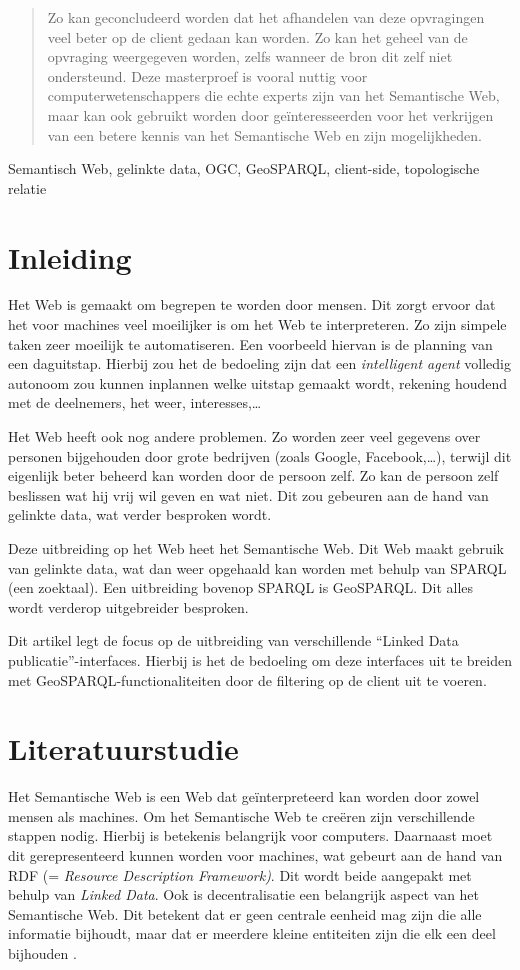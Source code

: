 \documentclass[twocolumn]{phdsymp} %
\begin{document}
\begin{abstract}
    Zo kan geconcludeerd worden dat het afhandelen van deze opvragingen veel beter op de client gedaan kan worden. Zo kan het geheel van de opvraging weergegeven worden, zelfs wanneer de bron dit zelf niet ondersteund. Deze masterproef is vooral nuttig voor computerwetenschappers die echte experts zijn van het Semantische Web, maar kan ook gebruikt worden door geïnteresseerden voor het verkrijgen van een betere kennis van het Semantische Web en zijn mogelijkheden.
\end{abstract}

\begin{keywords}
    Semantisch Web, gelinkte data, OGC, GeoSPARQL, client-side, topologische relatie
\end{keywords}

\section{Inleiding}
Het Web is gemaakt om begrepen te worden door mensen. Dit zorgt ervoor dat het voor machines veel moeilijker is om het Web te interpreteren. Zo zijn simpele taken zeer moeilijk te automatiseren. Een voorbeeld hiervan is de planning van een daguitstap. Hierbij zou het de bedoeling zijn dat een \textit{intelligent agent} volledig autonoom zou kunnen inplannen welke uitstap gemaakt wordt, rekening houdend met de deelnemers, het weer, interesses,\dots 

Het Web heeft ook nog andere problemen. Zo worden zeer veel gegevens over personen bijgehouden door grote bedrijven (zoals Google, Facebook,\dots), terwijl dit eigenlijk beter beheerd kan worden door de persoon zelf. Zo kan de persoon zelf beslissen wat hij vrij wil geven en wat niet. Dit zou gebeuren aan de hand van gelinkte data, wat verder besproken wordt.

Deze uitbreiding op het Web heet het Semantische Web. Dit Web maakt gebruik van gelinkte data, wat dan weer opgehaald kan worden met behulp van SPARQL (een zoektaal). Een uitbreiding bovenop SPARQL is GeoSPARQL. Dit alles wordt verderop uitgebreider besproken.

Dit artikel legt de focus op de uitbreiding van verschillende ``Linked Data publicatie''-interfaces. Hierbij is het de bedoeling om deze interfaces uit te breiden met GeoSPARQL-functionaliteiten door de filtering op de client uit te voeren.

\section{Literatuurstudie}
Het Semantische Web is een Web dat geïnterpreteerd kan worden door zowel mensen als machines. Om het Semantische Web te creëren zijn verschillende stappen nodig. Hierbij is betekenis belangrijk voor computers. Daarnaast moet dit gerepresenteerd kunnen worden voor machines, wat gebeurt aan de hand van RDF (= \textit{Resource Description Framework)}. Dit wordt beide aangepakt met behulp van \textit{Linked Data}. Ook is decentralisatie een belangrijk aspect van het Semantische Web. Dit betekent dat er geen centrale eenheid mag zijn die alle informatie bijhoudt, maar dat er meerdere kleine entiteiten zijn die elk een deel bijhouden \cite{berners2001semantic}.
\end{document}
